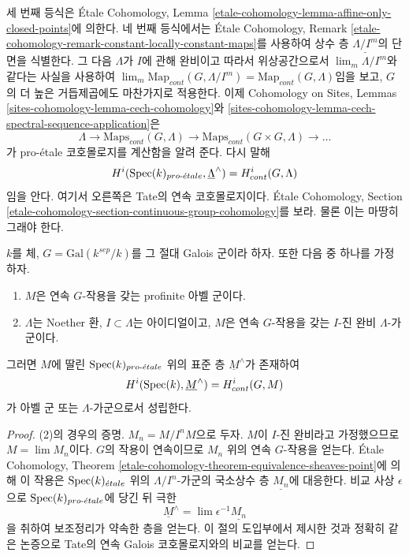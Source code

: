 세 번째 등식은 \'Etale Cohomology, Lemma
\ref{etale-cohomology-lemma-affine-only-closed-points}에 의한다.
네 번째 등식에서는 \'Etale Cohomology, Remark
\ref{etale-cohomology-remark-constant-locally-constant-maps}를 사용하여
상수 층 $\underline{\Lambda/I^m}$의 단면을 식별한다. 그 다음
$\Lambda$가 $I$에 관해 완비이고 따라서 위상공간으로서
$\lim_m \Lambda/I^m$와 같다는 사실을 사용하여
$\lim_m \text{Map}_{cont}(G, \Lambda/I^m) =
\text{Map}_{cont}(G, \Lambda)$임을 보고, $G$의 더 높은 거듭제곱에도
마찬가지로 적용한다. 이제 Cohomology on Sites, Lemmas
\ref{sites-cohomology-lemma-cech-cohomology}와
\ref{sites-cohomology-lemma-cech-spectral-sequence-application}은
$$
\Lambda \to \text{Maps}_{cont}(G, \Lambda) \to
\text{Maps}_{cont}(G \times G, \Lambda) \to \ldots
$$
가 pro-\'etale 코호몰로지를 계산함을 알려 준다. 다시 말해
$$
H^i(\mathop{\mathrm{Spec}}(k)_{pro\text{-}\acute{e}tale}, \underline{\Lambda}^\wedge)
=
H^i_{cont}(G, \Lambda)
$$
임을 안다. 여기서 오른쪽은 Tate의 연속 코호몰로지이다.
\'Etale Cohomology, Section
\ref{etale-cohomology-section-continuous-group-cohomology}를 보라.
물론 이는 마땅히 그래야 한다.

\begin{lemma}
\label{lemma-more-general-point}
$k$를 체, $G = \text{Gal}(k^{sep}/k)$를 그 절대 Galois 군이라 하자.
또한 다음 중 하나를 가정하자.
\begin{enumerate}
\item $M$은 연속 $G$-작용을 갖는 profinite 아벨 군이다.
\item $\Lambda$는 Noether 환, $I \subset \Lambda$는 아이디얼이고,
$M$은 연속 $G$-작용을 갖는 $I$-진 완비 $\Lambda$-가군이다.
\end{enumerate}
그러면 $M$에 딸린 $\mathop{\mathrm{Spec}}(k)_{pro\text{-}\acute{e}tale}$ 위의 표준 층
$\underline{M}^\wedge$가 존재하여
$$
H^i(\mathop{\mathrm{Spec}}(k), \underline{M}^\wedge) = H^i_{cont}(G, M)
$$
가 아벨 군 또는 $\Lambda$-가군으로서 성립한다.
\end{lemma}

\begin{proof}
(2)의 경우의 증명. $M_n = M/I^nM$으로 두자. $M$이 $I$-진 완비라고
가정했으므로 $M = \lim M_n$이다. $G$의 작용이 연속이므로 $M_n$ 위의
연속 $G$-작용을 얻는다. \'Etale Cohomology, Theorem
\ref{etale-cohomology-theorem-equivalence-sheaves-point}에 의해 이 작용은
$\mathop{\mathrm{Spec}}(k)_{\acute{e}tale}$ 위의 $\Lambda/I^n$-가군의 국소상수 층
$\underline{M_n}$에 대응한다. 비교 사상 $\epsilon$으로
$\mathop{\mathrm{Spec}}(k)_{pro\text{-}\acute{e}tale}$에 당긴 뒤 극한
$$
\underline{M}^\wedge = \lim \epsilon^{-1}\underline{M_n}
$$
을 취하여 보조정리가 약속한 층을 얻는다. 이 절의 도입부에서 제시한
것과 정확히 같은 논증으로 Tate의 연속 Galois 코호몰로지와의 비교를
얻는다.
\end{proof}







